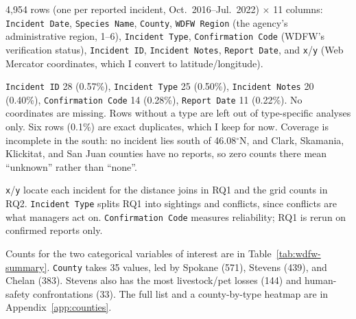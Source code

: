 \documentclass[11pt, a4paper]{article}
\begin{document}
\begin{description}[leftmargin=0pt, itemsep=4pt]

  \item[Size:] 4,954 rows (one per reported incident, Oct.\ 2016--Jul.\ 2022)
    $\times$ 11 columns: \texttt{Incident Date}, \texttt{Species Name},
    \texttt{County}, \texttt{WDFW Region} (the agency's administrative region, 1--6), \texttt{Incident Type},
    \texttt{Confirmation Code} (WDFW's verification status), \texttt{Incident ID}, \texttt{Incident Notes},
    \texttt{Report Date}, and \texttt{x}/\texttt{y} (Web Mercator coordinates, which I convert to
    latitude/longitude).

  \item[Missing:] \texttt{Incident ID} 28 (0.57\%), \texttt{Incident Type} 25
    (0.50\%), \texttt{Incident Notes} 20 (0.40\%), \texttt{Confirmation Code} 14
    (0.28\%), \texttt{Report Date} 11 (0.22\%). No coordinates are missing.
    Rows without a type are left out of type-specific analyses only. Six rows (0.1\%) are exact duplicates, which I keep for now.
    Coverage is incomplete in the south: no incident lies south of 46.08$^\circ$N, and Clark, Skamania, Klickitat, and San Juan counties have no reports, so zero counts there mean ``unknown'' rather than ``none''.

  \item[Variables of interest:]
    \texttt{x}/\texttt{y} locate each incident for the distance joins in RQ1 and the grid counts in RQ2.
    \texttt{Incident Type} splits RQ1 into sightings and conflicts, since conflicts are what managers act on.
    \texttt{Confirmation Code} measures reliability; RQ1 is rerun on confirmed reports only.

  \item[Summaries:] Counts for the two categorical variables of interest are
    in Table~\ref{tab:wdfw-summary}. \texttt{County} takes 35 values, led by
    Spokane (571), Stevens (439), and Chelan (383). Stevens also has the most
    livestock/pet losses (144) and human-safety confrontations (33). The full
    list and a county-by-type heatmap are in Appendix~\ref{app:counties}.

\end{description}
\end{document}
